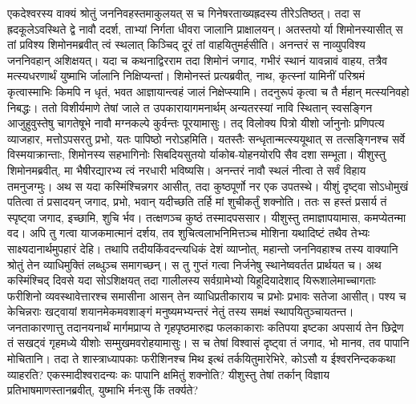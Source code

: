 \adhyAya
{}
\vakya एकदेश्वरस्य वाक्यं श्रोतुं जननिवहस्तमाकुलयत् स च गिनेषरताख्यह्रदस्य तीरेऽतिष्ठत्।
\vakya तदा स ह्रदकूलेऽवस्थिते द्वे नावौ ददर्श, ताभ्यां निर्गता धीवरा जालानि प्राक्षालयन्।
\vakya अतस्तयो र्या शिमोनस्यासीत् स तां प्रविश्य शिमोनमब्रवीत् त्वं स्थलात् किञ्चिद् दूरं तां वाहयितुमर्हसीति। अनन्तरं स नाव्युपविश्य जननिवहान् अशिक्षयत्।
\vakya यदा च कथनाद्विरराम तदा शिमोनं जगाद, गभीरं स्थानं यावन्नावं वाहय, तत्रैव मत्स्यधरणार्थं युष्माभि र्जालानि निक्षिप्यन्तां।
\vakya शिमोनस्तं प्रत्यब्रवीत्, नाथ, कृत्स्नां यामिनीं परिश्रमं कृत्वास्माभिः किमपि न धृतं, भवत आज्ञायान्त्वहं जालं निक्षेप्स्यामि।
\vakya तदनुरूपं कृत्वा च तै र्महान् मत्स्यनिवहो निबद्धः।
\vakya ततो विशीर्यमाणे तेषां जाले त उपकारायागमनार्थम् अन्यतरस्यां नावि स्थितान् स्वसङ्गिन आजुहुवुस्तेषु चागतेषूभे नावौ मग्नकल्पे कुर्वन्तः पूरयामासुः।
\vakya तद् विलोक्य पित्रो यीशो र्जानुनोः प्रणिपत्य व्याजहार, मत्तोऽपसरतु प्रभो, यतः पापिष्ठो नरोऽहमिति।
\vakya यतस्तैः सन्धृतान्मत्स्ययूथात् स तत्सङ्गिनश्च सर्वे विस्मयाक्रान्ताः,
\vakya शिमोनस्य सहभागिनोः सिबदियसुतयो र्याकोब-योहनयोरपि सैव दशा सम्भूता। यीशुस्तु शिमोनमब्रवीत्, मा भैषीरद्यारभ्य त्वं नरधारी भविष्यसि।
\vakya अनन्तरं नावौ स्थलं नीत्वा ते सर्वं विहाय तमनुजग्मुः।
\vakya अथ स यदा कस्मिंश्चिन्नगर आसीत्, तदा कुष्ठपूर्णो नर एक उपतस्थे। यीशुं दृष्ट्वा सोऽधोमुखं पतित्वा तं प्रसादयन् जगाद, प्रभो, भवान् यदीच्छति तर्हि मां शुचीकर्तुं शक्नोति।
\vakya ततः स हस्तं प्रसार्य तं स्पृष्ट्वा जगाद, इच्छामि, शुचि र्भव।
\vakya तत्क्षणञ्च कुष्ठं तस्मादपससार। यीशुस्तु तमाज्ञापयामास, कमप्येतन्मा वद। अपि तु गत्वा याजकमात्मानं दर्शय, तव शुचित्वलाभनिमित्तञ्च मोशिना यथादिष्टं तथैव तेभ्यः साक्ष्यदानार्थमुपहारं देहि।
\vakya तथापि तदीयकिंवदन्त्यधिकं देशं व्याप्नोत्, महान्तो जननिवहाश्च तस्य वाक्यानि श्रोतुं तेन व्याधिमुक्तिं लब्धुञ्च समागच्छन्।
\vakya स तु गुप्तं गत्वा निर्जनेषु स्थानेष्ववर्तत प्रार्थयत च।
\vakya अथ कस्मिंश्चिद् दिवसे यदा सोऽशिक्षयत् तदा गालीलस्य सर्वग्रामेभ्यो यिहूदियादेशाद् यिरूशालेमाच्चागताः फरीशिनो व्यवस्थावेत्तारश्च समासीना आसन् तेन व्याधिप्रतीकाराय च प्रभोः प्रभावः सतेजा आसीत्।
\vakya पश्य च केचिन्नराः खट्वायां शयानमेकमवशाङ्गं मनुष्यमभ्यन्तरं नेतुं तस्य समक्षं स्थापयितुञ्चायतन्त।
\vakya जनताकारणात्तु तदानयनार्थं मार्गमप्राप्य ते गृहपृष्ठमारुह्य फलकाकाराः कतिपया इष्टका अपसार्य तेन छिद्रेण तं सखट्वं गृहमध्ये यीशोः सम्मुखमवरोहयामासुः।
\vakya स च तेषां विश्वासं दृष्ट्वा तं जगाद, भो मानव, तव पापानि मोचितानि।
\vakya तदा ते शास्त्राध्यापकाः फरीशिनश्च मिथ इत्थं तर्कयितुमारेभिरे, कोऽसौ य ईश्वरनिन्दककथा व्याहरति? एकस्मादीश्वरादन्यः कः पापानि क्षमितुं शक्नोति?
\vakya यीशुस्तु तेषां तर्कान् विज्ञाय प्रतिभाषमाणस्तानब्रवीत्, युष्माभि र्मनःसु किं तर्क्यते?
